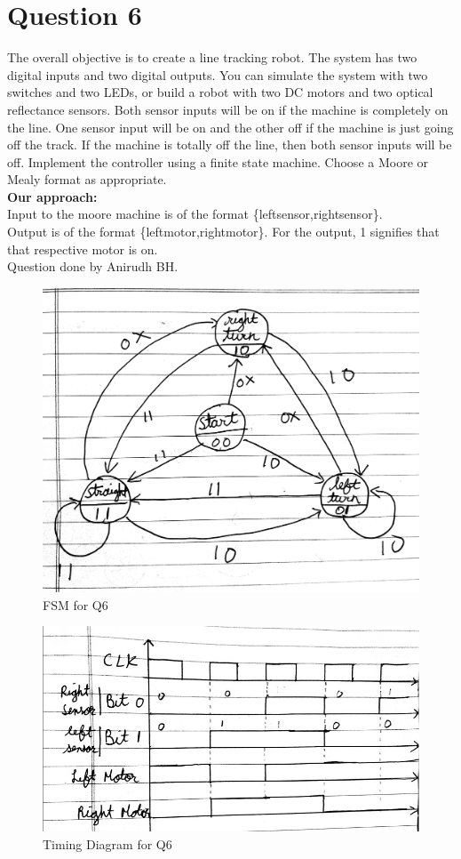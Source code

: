 \documentclass[11pt,a4paper]{article}
\begin{document}
	\section*{Question 6}
	The overall objective is to create a line tracking robot. The system has two digital
	inputs and two digital outputs. You can simulate the system with two switches and two LEDs, or build a robot with two DC motors and two optical reflectance sensors. Both sensor inputs will be on if the machine is completely on the line. One sensor input will be on and the other off if the machine is just going off the track. If the machine is totally off the line, then both sensor inputs will be off. Implement the controller using a finite state machine. Choose a Moore or Mealy format as appropriate.\\
	\textbf{Our approach:}\\
	Input to the moore machine is of the format \{leftsensor,rightsensor\}. \\Output is of the format \{leftmotor,rightmotor\}. For the output, 1 signifies that that respective motor is on. \\
	Question done by Anirudh BH.
	\begin{figure}[H]
		\centering
		\includegraphics[scale=0.1]{images/q6fsm}
		\caption[]{FSM for Q6}
		\label{fig:q6fsm}
	\end{figure}
	
	\begin{figure}[H]
		\centering
		\includegraphics[width=1\linewidth]{images/q6timing}
		\caption[]{Timing Diagram for Q6}
		\label{fig:q6timing}
	\end{figure}
\end{document}
